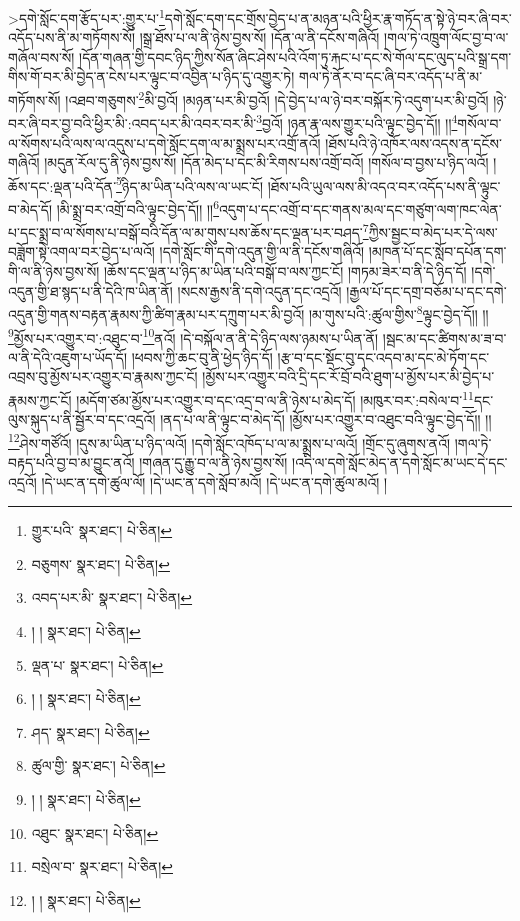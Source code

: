 >དགེ་སློང་དག་རྩོད་པར་:གྱུར་པ་\footnote{གྱུར་པའི་  སྣར་ཐང་།  པེ་ཅིན། }དགེ་སློང་དག་དང་གྲོས་བྱེད་པ་ན་མཉན་པའི་ཕྱིར་རྣ་གཏོད་ན་སྟེ་ཉེ་བར་ཞི་བར་འདོད་པས་ནི་མ་གཏོགས་སོ། །སྒྲ་ཐོས་པ་ལ་ནི་ཉེས་བྱས་སོ། །དོན་ལ་ནི་དངོས་གཞིའོ། །གལ་ཏེ་འཁྲུག་ལོང་བྱ་བ་ལ་གཞོལ་བས་སོ། །དོན་གཞན་གྱི་དབང་ཉིད་ཀྱིས་སོན་ཞིང་ཤེས་པའི་འོག་ཏུ་རྐང་པ་དང་སེ་གོལ་དང་ལུད་པའི་སྒྲ་དག་གིས་གོ་བར་མི་བྱེད་ན་ངེས་པར་ལྟུང་བ་འབྱིན་པ་ཉིད་དུ་འགྱུར་ཏེ། གལ་ཏེ་ནོར་བ་དང་ཞི་བར་འདོད་པ་ནི་མ་གཏོགས་སོ། །འཐབ་གཅུགས་\footnote{བཅུགས་  སྣར་ཐང་།  པེ་ཅིན། }མི་བྱའོ། །མཉན་པར་མི་བྱའོ། །དེ་བྱེད་པ་ལ་ཉེ་བར་བསྐོར་ཏེ་འདུག་པར་མི་བྱའོ། །ཉེ་བར་ཞི་བར་བྱ་བའི་ཕྱིར་མི་:འབད་པར་མི་འབར་བར་མི་\footnote{འབད་པར་མི་  སྣར་ཐང་།  པེ་ཅིན། }བྱའོ། །ཉན་རྣ་ལས་གྱུར་པའི་ལྟུང་བྱེད་དོ།། །།\footnote{། །  སྣར་ཐང་།  པེ་ཅིན། }གསོལ་བ་ལ་སོགས་པའི་ལས་ལ་འདུས་པ་དགེ་སློང་དག་ལ་མ་སྨྲས་པར་འགྲོ་ནའོ། །ཐོས་པའི་ཉེ་འཁོར་ལས་འདས་ན་དངོས་གཞིའོ། །མདུན་རོལ་དུ་ནི་ཉེས་བྱས་སོ། །དོན་མེད་པ་དང་མི་རིགས་པས་འགྲོ་བའོ། །གསོལ་བ་བྱས་པ་ཉིད་ལའོ། །ཆོས་དང་:ལྡན་པའི་དོན་\footnote{ལྡན་པ་  སྣར་ཐང་།  པེ་ཅིན། }ཉིད་མ་ཡིན་པའི་ལས་ལ་ཡང་ངོ། །ཐོས་པའི་ཡུལ་ལས་མི་འདའ་བར་འདོད་པས་ནི་ལྟུང་བ་མེད་དོ། །མི་སྨྲ་བར་འགྲོ་བའི་ལྟུང་བྱེད་དོ།། །།\footnote{། །  སྣར་ཐང་།  པེ་ཅིན། }འདུག་པ་དང་འགྲོ་བ་དང་གནས་མལ་དང་གཙུག་ལག་ཁང་ལེན་པ་དང་སྨྲ་བ་ལ་སོགས་པ་བསྒོ་བའི་དོན་ལ་མ་གུས་པས་ཆོས་དང་ལྡན་པར་བཤད་\footnote{ཤད་  སྣར་ཐང་།  པེ་ཅིན། }ཀྱིས་སྦྱང་བ་མེད་པར་དེ་ལས་བཟློག་སྟེ་འགལ་བར་བྱེད་པ་ལའོ། །དགེ་སློང་གི་དགེ་འདུན་གྱི་ལ་ནི་དངོས་གཞིའོ། །མཁན་པོ་དང་སློབ་དཔོན་དག་གི་ལ་ནི་ཉེས་བྱས་སོ། །ཆོས་དང་ལྡན་པ་ཉིད་མ་ཡིན་པའི་བསྒོ་བ་ལས་ཀྱང་ངོ། །གཏམ་ཟེར་བ་ནི་དེ་ཉིད་དོ། །དགེ་འདུན་གྱི་ཐ་སྙད་པ་ནི་དེའི་ཁ་ཡིན་ནོ། །སངས་རྒྱས་ནི་དགེ་འདུན་དང་འདྲའོ། །རྒྱལ་པོ་དང་དགྲ་བཅོམ་པ་དང་དགེ་འདུན་གྱི་གནས་བརྟན་རྣམས་ཀྱི་ཚིག་རྣམ་པར་དཀྲུག་པར་མི་བྱའོ། །མ་གུས་པའི་:ཚུལ་གྱིས་\footnote{ཚུལ་གྱི་  སྣར་ཐང་།  པེ་ཅིན། }ལྟུང་བྱེད་དོ།། །།\footnote{། །  སྣར་ཐང་།  པེ་ཅིན། }མྱོས་པར་འགྱུར་བ་:འཐུང་བ་\footnote{འཐུང་  སྣར་ཐང་།  པེ་ཅིན། }ནའོ། །དེ་བསྐོལ་ན་ནི་དེ་ཉིད་ལས་ཉམས་པ་ཡིན་ནོ། །སྦང་མ་དང་ཚིགས་མ་ཟ་བ་ལ་ནི་དེའི་འཇུག་པ་ཡོད་དོ། །ཕབས་ཀྱི་ཆང་བུ་ནི་ཕྱེད་ཉིད་དོ། །རྩ་བ་དང་སྡོང་བུ་དང་འདབ་མ་དང་མེ་ཏོག་དང་འབྲས་བུ་མྱོས་པར་འགྱུར་བ་རྣམས་ཀྱང་ངོ། །མྱོས་པར་འགྱུར་བའི་དྲི་དང་རོ་བྲོ་བའི་ཐུག་པ་མྱོས་པར་མི་བྱེད་པ་རྣམས་ཀྱང་ངོ། །མདོག་ཙམ་མྱོས་པར་འགྱུར་བ་དང་འདྲ་བ་ལ་ནི་ཉེས་པ་མེད་དོ། །མཁུར་བར་:བསེལ་བ་\footnote{བསྲེལ་བ་  སྣར་ཐང་།  པེ་ཅིན། }དང་ལུས་སྐུད་པ་ནི་སྦྱོར་བ་དང་འདྲའོ། །ནད་པ་ལ་ནི་ལྟུང་བ་མེད་དོ། །མྱོས་པར་འགྱུར་བ་འཐུང་བའི་ལྟུང་བྱེད་དོ།། །།\footnote{། །  སྣར་ཐང་།  པེ་ཅིན། }ཤེས་གཙོའོ། །དུས་མ་ཡིན་པ་ཉིད་ལའོ། །དགེ་སློང་འཁོད་པ་ལ་མ་སྨྲས་པ་ལའོ། །གྲོང་དུ་ཞུགས་ནའོ། །གལ་ཏེ་བརྟད་པའི་བྱ་བ་མ་བྱུང་ནའོ། །གཞན་དུ་རྒྱུ་བ་ལ་ནི་ཉེས་བྱས་སོ། །འདི་ལ་དགེ་སློང་མེད་ན་དགེ་སློང་མ་ཡང་དེ་དང་འདྲའོ། །དེ་ཡང་ན་དགེ་ཚུལ་ལོ། །དེ་ཡང་ན་དགེ་སློབ་མའོ། །དེ་ཡང་ན་དགེ་ཚུལ་མའོ། །
